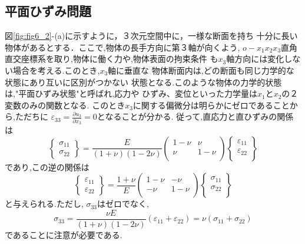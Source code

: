 \documentclass[10pt,a4j]{jarticle}
\begin{document}
\subsection{平面ひずみ問題}
図\ref{fig:fig6_2}-(a)に示すように，３次元空間中に，一様な断面を持ち
十分に長い物体があるとする．ここで,物体の長手方向に第３軸が向くよう,
$o-x_1x_2x_3$直角直交座標系を取り,物体に働く力や,物体表面の拘束条件
も$x_3$軸方向には変化しない場合を考える.このとき,$x_3$軸に垂直な
物体断面内は,どの断面も同じ力学的な状態にあり互いに区別がつかない
状態となる.このような物体の力学的状態は,"平面ひずみ状態"と呼ばれ,応力や
ひずみ、変位といった力学量は$x_1$と$x_2$の２変数のみの関数となる.
このとき$x_3$に関する偏微分は明らかにゼロであることから,ただちに
$\varepsilon_{33}=\frac{\partial u_3}{\partial x_3}=0$となることが分かる.
従って,直応力と直ひずみの関係は
\begin{equation}
	\left\{ 
	\begin{array}{*{20}{c}}
		\sigma _{11}\\
		\sigma _{22}
	\end{array} 
	\right\} 
	= 
	\frac{E}{\left( 1 + \nu  \right)\left( 1 - 2\nu  \right)}
	\left( 
		\begin{array}{*{20}{c}}
		1 - \nu & \nu \\
		\nu & 1 - \nu \\
		\end{array}
	\right)
	\left\{ 
		\begin{array}{*{20}{c}}
		\varepsilon _{11}\\
		\varepsilon _{22}\\
		\end{array}
	\right\}
	\label{eqn:Hooke_pstrain}
\end{equation}
であり,この逆の関係は
\begin{equation}
	\left\{ 
	\begin{array}{*{20}{c}}
		\varepsilon _{11}\\
		\varepsilon_{22}
	\end{array} 
	\right\} 
	= 
	\frac{1+\nu}{E}
	\left( 
		\begin{array}{*{20}{c}}
		1 - \nu & -\nu \\
		-\nu & 1 - \nu \\
		\end{array}
	\right)
	\left\{ 
		\begin{array}{*{20}{c}}
		\sigma_{11}\\
		\sigma_{22}\\
		\end{array}
	\right\}
	\label{eqn:Hooke_pstrain}
\end{equation}
と与えられる.ただし, $\sigma_{33}$はゼロでなく,
\begin{equation}
	\sigma_{33}
	=\frac{\nu E}{(1+\nu)(1-2\nu)}\left(\varepsilon_{11}+\varepsilon_{22}\right)
	=\nu \left(\sigma_{11}+\sigma_{22}\right)
	\label{eqn:s33_pstrain}
\end{equation}
であることに注意が必要である.
\end{document}

